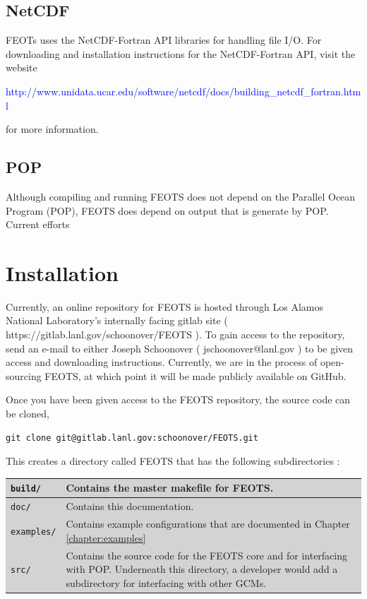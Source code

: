 \documentclass{softwaremanual}
\begin{document}
\subsection{NetCDF}
 FEOTs uses the NetCDF-Fortran API libraries for handling file I/O. For downloading and installation instructions for the NetCDF-Fortran API, visit the website
 \begin{center}
 \textcolor{blue}{http://www.unidata.ucar.edu/software/netcdf/docs/building\_netcdf\_fortran.html}
 \end{center}
for more information.
  
  \subsection{POP}
  Although compiling and running FEOTS does not depend on the Parallel Ocean Program (POP), FEOTS does depend on output that is generate by POP. Current efforts
\section{Installation}
  Currently, an online repository for FEOTS is hosted through Los Alamos National Laboratory's internally facing gitlab site ( https://gitlab.lanl.gov/schoonover/FEOTS ). To gain access to the repository, send an e-mail to either Joseph Schoonover ( jschoonover@lanl.gov ) to be given access and downloading instructions. Currently, we are in the process of open-sourcing FEOTS, at which point it will be made publicly available on GitHub.
  
Once you have been given access to the FEOTS repository, the source code can be cloned,
\begin{verbatim}
git clone git@gitlab.lanl.gov:schoonover/FEOTS.git
\end{verbatim}
This creates a directory called FEOTS that has the following subdirectories :

\vspace{0.5cm}
\hspace{-1.0cm}
\begingroup\setlength{\fboxsep}{0pt}
  \colorbox{lightgray}{
    \begin{tabular}{p{} | p{}}
    \toprule
    \texttt{build/} & Contains the master makefile for FEOTS.\\
    \midrule
    \texttt{doc/} & Contains this documentation. \\
    \midrule
    \texttt{examples/} & Contains example configurations that are documented in Chapter \ref{chapter:examples}\\
    \midrule
    \texttt{src/} & Contains the source code for the FEOTS core and for interfacing with POP. Underneath this directory, a developer would add a subdirectory for interfacing with other GCMs. \\
    \bottomrule
\end{tabular}
}\endgroup
\vspace{0.5cm}
\end{document}
